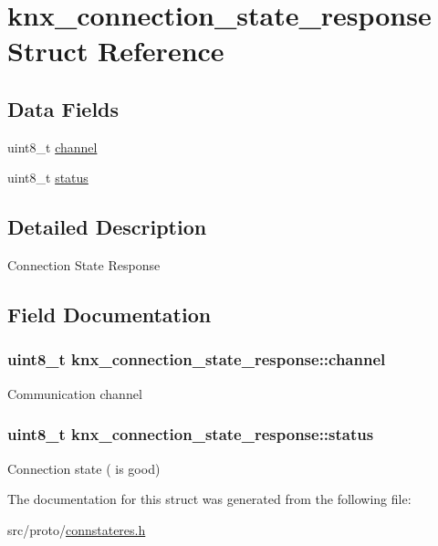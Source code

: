 \hypertarget{structknx__connection__state__response}{}\section{knx\+\_\+connection\+\_\+state\+\_\+response Struct Reference}
\label{structknx__connection__state__response}
\subsection*{Data Fields}
\begin{DoxyCompactItemize}
\item 
uint8\+\_\+t \hyperlink{structknx__connection__state__response_ab10df9205a64287c788323c6e952af76}{channel}
\item 
uint8\+\_\+t \hyperlink{structknx__connection__state__response_a7f709ebeecca63479cf84cc88439d6e1}{status}
\end{DoxyCompactItemize}


\subsection{Detailed Description}
Connection State Response 

\subsection{Field Documentation}
\subsubsection[{\texorpdfstring{channel}{channel}}]{\setlength{\rightskip}{0pt plus 5cm}uint8\+\_\+t knx\+\_\+connection\+\_\+state\+\_\+response\+::channel}\hypertarget{structknx__connection__state__response_ab10df9205a64287c788323c6e952af76}{}\label{structknx__connection__state__response_ab10df9205a64287c788323c6e952af76}
Communication channel 
\subsubsection[{\texorpdfstring{status}{status}}]{\setlength{\rightskip}{0pt plus 5cm}uint8\+\_\+t knx\+\_\+connection\+\_\+state\+\_\+response\+::status}\hypertarget{structknx__connection__state__response_a7f709ebeecca63479cf84cc88439d6e1}{}\label{structknx__connection__state__response_a7f709ebeecca63479cf84cc88439d6e1}
Connection state ({} is good) 

The documentation for this struct was generated from the following file\+:\begin{DoxyCompactItemize}
\item 
src/proto/\hyperlink{connstateres_8h}{connstateres.\+h}\end{DoxyCompactItemize}
